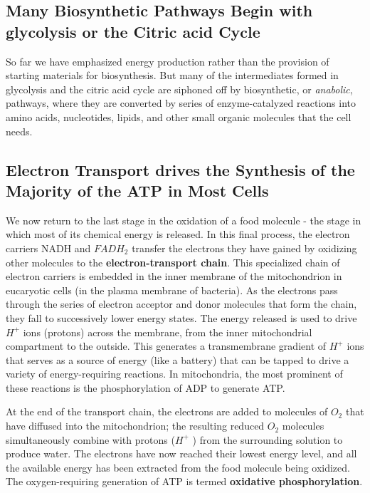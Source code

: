 \subsection{Many Biosynthetic Pathways Begin with glycolysis or the Citric acid Cycle}

So far we have emphasized
energy production rather than the provision of starting materials for biosynthesis.
But many of the intermediates formed in glycolysis and the
citric acid cycle are siphoned off by biosynthetic, or \textit{anabolic}, pathways,
where they are converted by series of enzyme-catalyzed reactions into
amino acids, nucleotides, lipids, and other small organic molecules that
the cell needs.

\subsection{Electron Transport drives the Synthesis of the Majority of the ATP in Most Cells}

We now return to the last stage in the oxidation of a food molecule -
the stage in which most of its chemical energy is released. In this final
process, the electron carriers NADH and $FADH_2$ transfer the electrons
they have gained by oxidizing other molecules to the \textbf{electron-transport chain}.
This specialized chain of electron carriers is embedded in
the inner membrane of the mitochondrion in eucaryotic cells (in the
plasma membrane of bacteria). As the electrons pass through the series
of electron acceptor and donor molecules that form the chain, they fall to
successively lower energy states. The energy released is used to drive $H^+$
ions (protons) across the membrane, from the inner mitochondrial compartment to the outside.
This generates a transmembrane gradient of $H^+$
ions that serves as a source of energy (like a battery) that can be tapped
to drive a variety of energy-requiring reactions. In mitochondria,
the most prominent of these reactions is the phosphorylation
of ADP to generate ATP.

At the end of the transport chain, the electrons are added to molecules
of $O_2$ that have diffused into the mitochondrion; the resulting reduced
$O_2$ molecules simultaneously combine with protons ($H^+$ ) from the surrounding
solution to produce water. The electrons have now reached
their lowest energy level, and all the available energy has been extracted
from the food molecule being oxidized. The oxygen-requiring generation
of ATP is termed \textbf{oxidative phosphorylation}.


